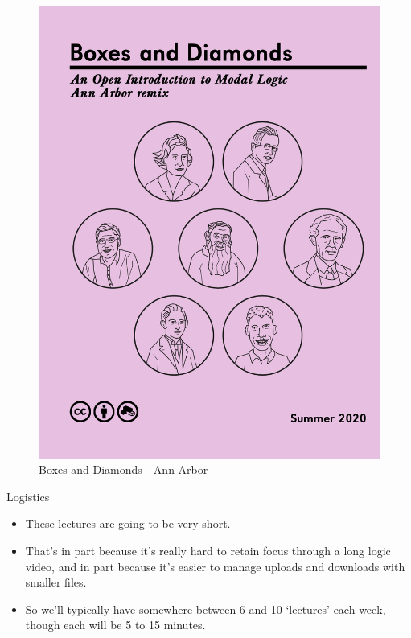 \documentclass[
  ignorenonframetext,
]{beamer}
\providecommand{\tightlist}{%
  \setlength{\itemsep}{0pt}\setlength{\parskip}{0pt}}
\renewcommand{\,}{\text{, }}
\begin{document}
\begin{frame}
\begin{figure}
\centering
\includegraphics[width=\textwidth,height=0.8\textheight]{../images/1_1_Boxes_and_Diamonds_AA.png}
\caption{Boxes and Diamonds - Ann Arbor}
\end{figure}
\end{frame}

\begin{frame}{Logistics}
\protect\hypertarget{logistics}{}
\begin{itemize}
\tightlist
\item
  These lectures are going to be very short.
\item
  That's in part because it's really hard to retain focus through a long
  logic video, and in part because it's easier to manage uploads and
  downloads with smaller files.
\item
  So we'll typically have somewhere between 6 and 10 `lectures' each
  week, though each will be 5 to 15 minutes.
\end{itemize}
\end{frame}
\end{document}
